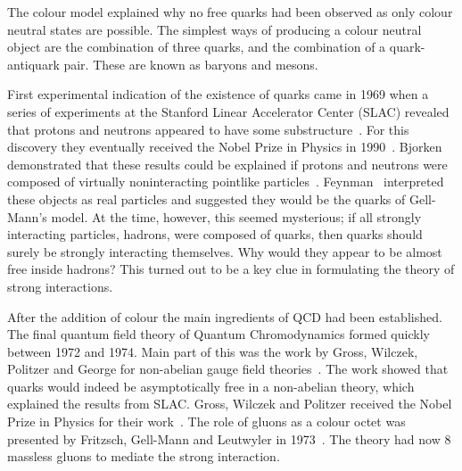 


The colour model explained why no free quarks had been observed as only colour neutral states are possible. The simplest ways of producing a colour neutral object are the combination of three quarks, and the combination of a quark-antiquark pair. These are known as baryons and mesons.

First experimental indication of the existence of quarks came in 1969 when a series of experiments at the Stanford Linear Accelerator Center (SLAC) revealed that protons and neutrons appeared to have some substructure~\cite{Bloom:1969kcm, Breidenbach:1969kd}. For this discovery they eventually received the Nobel Prize in Physics in 1990~\cite{Nobel1990}. Bjorken demonstrated that these results could be explained if protons and neutrons were composed of virtually noninteracting pointlike particles~\cite{Bjorken:1968dy,Bjorken:1969ja}. Feynman~\cite{Feynman:1969ej} interpreted these objects as real particles and suggested they would be the quarks of Gell-Mann's model. At the time, however, this seemed mysterious; if all strongly interacting particles, hadrons, were composed of quarks, then quarks should surely be strongly interacting themselves. Why would they appear to be almost free inside hadrons? This turned out to be a key clue in formulating the theory of strong interactions.~\cite{Krauss:2017} 

After the addition of colour the main ingredients of QCD had been established. The final quantum field theory of Quantum Chromodynamics formed quickly between 1972 and 1974. Main part of this was the work by Gross, Wilczek, Politzer and George for non-abelian gauge field theories~\cite{gross1973ultraviolet, politzer1973reliable, gross1973asymptotically, gross1974asymptotically, georgi1974electroproduction}. The work showed that quarks would indeed be asymptotically free in a non-abelian theory, which explained the results from SLAC. Gross, Wilczek and Politzer received the Nobel Prize in Physics for their work~\cite{Nobel2004}. The role of gluons as a colour octet was presented by Fritzsch, Gell-Mann and Leutwyler in 1973~\cite{fritzsch1973advantages}. The theory had now 8 massless gluons to mediate the strong interaction.

